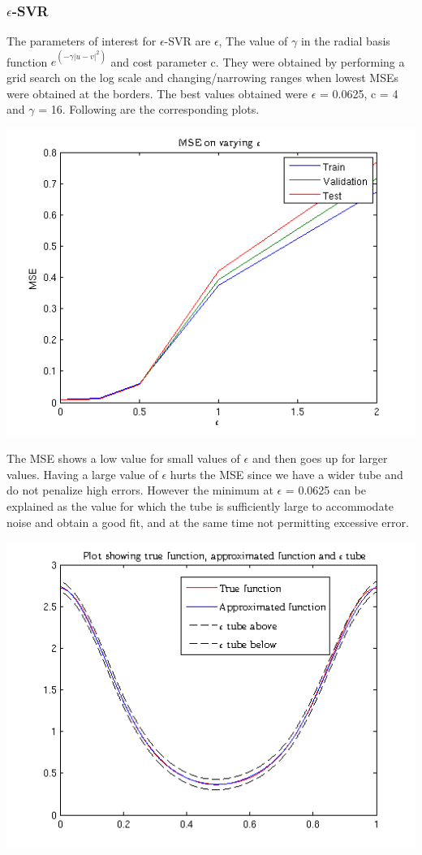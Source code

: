 \documentclass{article}
\begin{document}
\subsubsection{$\epsilon$-SVR}
The parameters of interest for $\epsilon$-SVR are $\epsilon$, The value of $\gamma$ in the radial basis function $e^{(-\gamma|u-v|^2)}$ and cost parameter c. They were obtained by performing a grid search on the log scale and changing/narrowing ranges when lowest MSEs were obtained at the borders.
The best values obtained were $\epsilon$ = 0.0625, c = 4 and $\gamma$ = 16. Following are the corresponding plots.
\begin{center}
\includegraphics[scale=0.6]{Regression/mse}
\end{center}
The MSE shows a low value for small values of $\epsilon$ and then goes up for larger values. Having a large value of $\epsilon$ hurts the MSE since we have a wider tube and do not penalize high errors. However the minimum at $\epsilon$ = 0.0625 can be explained as the value for which the tube is sufficiently large to accommodate noise and obtain a good fit, and at the same time not permitting excessive error.
\begin{center}
\includegraphics[scale=0.7]{Regression/Plot_1}
\end{center}
\end{document}
